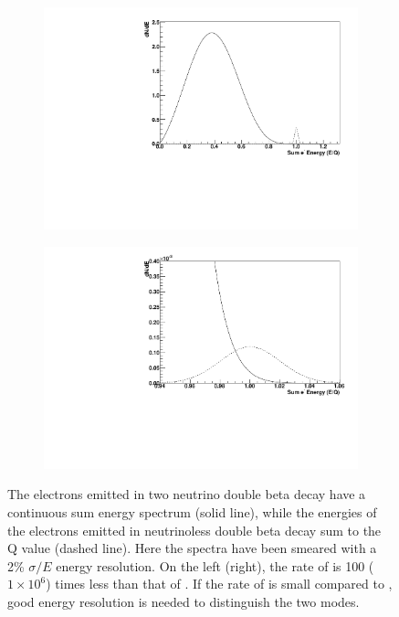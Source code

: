 \documentclass[herrin-thesis.tex]{subfiles}
\begin{document}
\begin{figure}[htp]
         \begin{subfigure}[b]{0.48\textwidth}
		\centering
		\includegraphics[width=\textwidth]{./plots/nu_comp_2nu_0nu_1e2.pdf}
	\end{subfigure}\hfill%
         \begin{subfigure}[b]{0.48\textwidth}
		\centering
		\includegraphics[width=\textwidth]{./plots/nu_comp_2nu_0nu_1e6.pdf}
	\end{subfigure}
	\caption[Comparison of \twonu{} and \zeronu{} energy spectra]{The electrons emitted in two neutrino double beta decay have a continuous sum energy spectrum (solid line), while the energies of the electrons emitted in neutrinoless double beta decay sum to the Q value (dashed line). Here the spectra have been smeared with a 2\% \(\sigma/E\) energy resolution. On the left (right), the rate of \zeronu{} is 100 (\(1\times10^{6}\)) times less than that of \twonu{}. If the rate of \zeronu{} is small compared to \twonu{}, good energy resolution is needed to distinguish the two modes.}
	\label{fig:nu_comp_2nu_0nu}
\end{figure}
\end{document}
